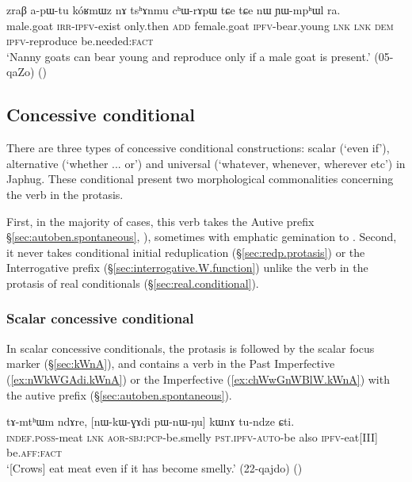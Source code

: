 \begin{exe}
	\ex \label{ex:nWkoRmWznA.only.if2}
	\gll zraβ a-pɯ-tu kóʁmɯz nɤ tsʰɤnmu cʰɯ-rɤpɯ tɕe tɕe nɯ ɲɯ-mpʰɯl ra.\\
	male.goat \textsc{irr}-\textsc{ipfv}-exist only.then \textsc{add} female.goat \textsc{ipfv}-bear.young \textsc{lnk} \textsc{lnk} \textsc{dem} \textsc{ipfv}-reproduce be.needed:\textsc{fact} \\
	\glt `Nanny goats can bear young and reproduce only if a male goat is present.' (05-qaZo)
	()
\end{exe}
 
 \subsection{Concessive conditional} \label{sec:concessive.conditional}
There are three types of concessive conditional constructions: scalar (`even if'), alternative (`whether ... or') and universal (`whatever, whenever, wherever etc') in Japhug. These conditional present two morphological commonalities concerning the verb in the protasis. 

First, in the majority of cases, this verb  takes the Autive prefix   §\ref{sec:autoben.spontaneous}, \citealt[298--300]{jacques14linking}), sometimes with emphatic gemination to . Second, it never takes  conditional initial reduplication (§\ref{sec:redp.protasis}) or the Interrogative prefix (§\ref{sec:interrogative.W.function}) unlike the verb in the protasis of real conditionals (§\ref{sec:real.conditional}).  

 
\subsubsection{Scalar concessive conditional} \label{sec:scalar.concessive.conditional}
In scalar concessive conditionals, the protasis is followed by the scalar focus marker  (§\ref{sec:kWnA}), and contains a verb  in the Past Imperfective (\ref{ex:nWkWGAdi.kWnA}) or the Imperfective (\ref{ex:chWwGnWBlW.kWnA}) with the autive prefix (§\ref{sec:autoben.spontaneous}).
 
\begin{exe}
\ex \label{ex:nWkWGAdi.kWnA}
 \gll tɤ-mtʰɯm ndɤre, [nɯ-kɯ-ɣɤdi pɯ-nɯ-ŋu] kɯnɤ tu-ndze ɕti. \\
 \textsc{indef}.\textsc{poss}-meat \textsc{lnk} \textsc{aor}-\textsc{sbj}:\textsc{pcp}-be.smelly \textsc{pst}.\textsc{ipfv}-\textsc{auto}-be also \textsc{ipfv}-eat[III] be.\textsc{aff}:\textsc{fact} \\
\glt `[Crows] eat meat even if it has become smelly.' (22-qajdo)
()
 \end{exe}
 
